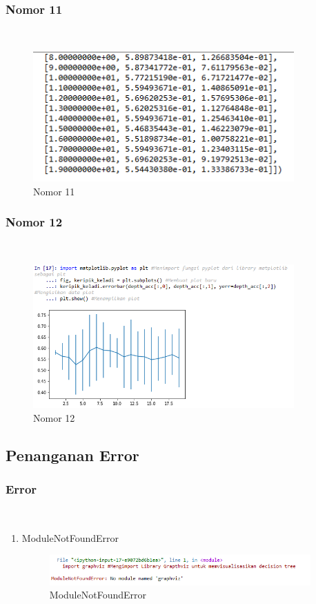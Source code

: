 \subsubsection{Nomor 11}
\hfill\\

\begin{figure}[H]
\centerline{\includegraphics[width=10cm]{figures/1174077/2/p11.png}}
\caption{Nomor 11}
\label{labelgambar}
\end{figure}

\subsubsection{Nomor 12}
\hfill\\

\begin{figure}[H]
\centerline{\includegraphics[width=10cm]{figures/1174077/2/p12.png}}
\caption{Nomor 12}
\label{labelgambar}
\end{figure}

\subsection{Penanganan Error}
\subsubsection{Error}
\hfill\\
\begin{enumerate}
\item ModuleNotFoundError

\begin{figure}[H]
\centerline{\includegraphics[width=10cm]{figures/1174077/2/error1.png}}
\caption{ModuleNotFoundError}
\label{labelgambar}
\end{figure}
\end{enumerate}

